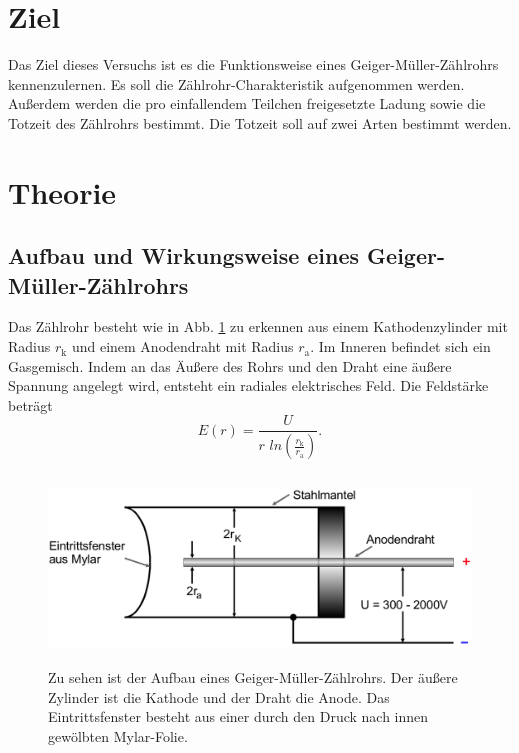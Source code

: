 \section{Ziel}
Das Ziel dieses Versuchs ist es die Funktionsweise eines Geiger-Müller-Zählrohrs kennenzulernen. Es soll die Zählrohr-Charakteristik aufgenommen werden.
Außerdem werden die pro einfallendem Teilchen freigesetzte Ladung sowie die Totzeit des Zählrohrs bestimmt. Die Totzeit soll auf zwei Arten bestimmt werden.

\section{Theorie}
\label{sec:Theorie}

\subsection{Aufbau und Wirkungsweise eines Geiger-Müller-Zählrohrs}

Das Zählrohr besteht wie in Abb. \ref{fig:zaehlrohr} zu erkennen aus einem Kathodenzylinder mit Radius $r_\text{k}$ und einem Anodendraht mit Radius $r_\text{a}$. Im Inneren befindet sich ein Gasgemisch. Indem an das Äußere des Rohrs und den Draht eine äußere Spannung angelegt wird, entsteht ein radiales elektrisches Feld. Die Feldstärke beträgt 
\begin{equation*}
    E(r) = \frac{U}{r \, \, ln \left(\frac{r_\text{k}}{r_\text{a}} \right)}.
    \label{eqn:feldstärke}
\end{equation*}


\begin{figure}
    \centering
    \includegraphics[width=12cm, height=5cm]{build/zaehlrohr.png}
    \caption{Zu sehen ist der Aufbau eines Geiger-Müller-Zählrohrs. Der äußere Zylinder ist die Kathode und der Draht die Anode. Das Eintrittsfenster besteht aus einer durch den Druck nach innen gewölbten Mylar-Folie. \cite{V703}}
    \label{fig:zaehlrohr}
\end{figure}

